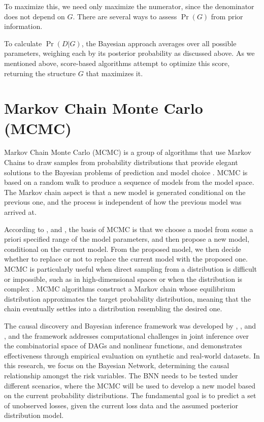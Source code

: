 To maximize this, we need only maximize the numerator, since the denominator does not depend on \( G \). There are several ways to assess \( \Pr(G) \) from prior information. 

To calculate \( \Pr(D | G) \), the Bayesian approach averages over all possible parameters, weighing each by its posterior probability as discussed above. As we mentioned above, score-based algorithms attempt to optimize this score, returning the structure \( G \) that maximizes it.

\section{Markov Chain Monte Carlo (MCMC)}
Markov Chain Monte Carlo (MCMC) is a group of algorithms that use Markov Chains to draw samples from probability distributions that provide elegant solutions to the Bayesian problems of prediction and model choice \parencite{gilks2001markov}. MCMC is based on a random walk to produce a sequence of models from the model space. The Markov chain aspect is that a new model is generated conditional on the previous one, and the process is independent of how the previous model was arrived at.

According to \textcite{karandikar2006mcmc}, and \textcite{gallagher2009markov}, the basis of MCMC is that we choose a model from some a priori specified range of the model parameters, and then propose a new model, conditional on the current model. From the proposed model, we then decide whether to replace or not to replace the current model with the proposed one. MCMC is particularly useful when direct sampling from a distribution is difficult or impossible, such as in high-dimensional spaces or when the distribution is complex \textcite{koop1997bayesian}. MCMC algorithms construct a Markov chain whose equilibrium distribution approximates the target probability distribution, meaning that the chain eventually settles into a distribution resembling the desired one. 

The causal discovery and Bayesian inference framework was developed by \textcite{annadani2023bayesdag}, \textcite{mclachlan2024approach}, and  \textcite{gilks2001markov}, and the framework addresses computational challenges in joint inference over the combinatorial space of DAGs and nonlinear functions, and demonstrates effectiveness through empirical evaluation on synthetic and real-world datasets. In this research, we focus on the Bayesian Network, determining the causal relationship amongst the risk variables. The BNN needs to be tested under different scenarios, where the MCMC will be used to develop a new model based on the current probability distributions. The fundamental goal is to predict a set of unobserved losses, given the current loss data and the assumed posterior distribution model. 
